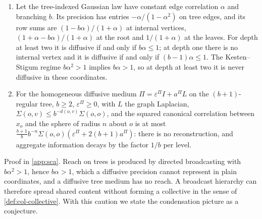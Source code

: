\begin{proposition}\label{prop:sca-tree-diffusive}
\begin{enumerate}
\item[(a)] Let the tree-indexed Gaussian law have constant edge correlation $\alpha$ and branching $b$. Its precision has entries $-\alpha/(1-\alpha^2)$ on tree edges, and its row sums are $(1-b\alpha)/(1+\alpha)$ at internal vertices, $(1+\alpha-b\alpha)/(1+\alpha)$ at the root and $1/(1+\alpha)$ at the leaves. For depth at least two it is diffusive if and only if $b\alpha\le1$; at depth one there is no internal vertex and it is diffusive if and only if $(b-1)\alpha\le1$. The Kesten--Stigum regime $b\alpha^2>1$ implies $b\alpha>1$, so at depth at least two it is never diffusive in these coordinates.
\item[(b)] For the homogeneous diffusive medium $\Pi=\varepsilon^\Pi I+a^\Pi L$ on the $(b+1)$-regular tree, $b\ge2$, $\varepsilon^\Pi\ge0$, with $L$ the graph Laplacian, $\Sigma(o,v)\le b^{-d(o,v)}\Sigma(o,o)$, and the squared canonical correlation between $x_o$ and the sphere of radius $n$ about $o$ is at most $\tfrac{b+1}{b}b^{-n}\Sigma(o,o)(\varepsilon^\Pi+2(b+1)a^\Pi)$: there is no reconstruction, and aggregate information decays by the factor $1/b$ per level.
\end{enumerate}
\end{proposition}
Proof in \cref{app:sca}. Reach on trees is produced by directed broadcasting with $b\alpha^2>1$, hence $b\alpha>1$, which a diffusive precision cannot represent in plain coordinates, and a diffusive tree medium has no reach. A broadcast hierarchy can therefore spread shared content without forming a collective in the sense of \cref{def:col-collective}. With this caution we state the condensation picture as a conjecture.

